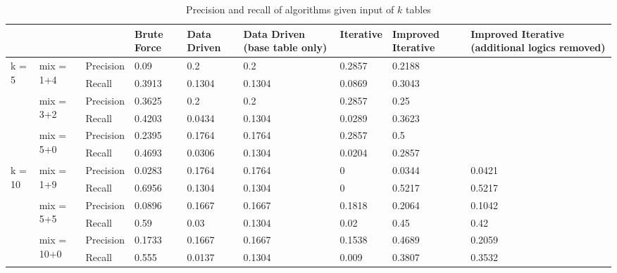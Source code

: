 \begin{table}[h!]
    \centering
    \scriptsize
    \begin{center}
      \caption{Precision and recall of algorithms given input of $k$ tables}
      \label{tab:Precision-and-recall-of-algorithms-given-input-of-k-tables}
      \begin{tabular}{|p{}|p{}|p{}|p{}|p{}|p{}|p{}|p{}|p{}|}  
        \hline
        & & & \textbf{Brute Force} & \textbf{Data Driven} & \textbf{Data Driven (base table only)} & \textbf{Iterative} & \textbf{Improved Iterative} & \textbf{Improved Iterative (additional logics removed)}\\
        \hline
        \multirow{6}{*}{k = 5} & \multirow{2}{*}{mix = 1+4} & Precision & 0.09 & 0.2 & 0.2 & 0.2857 & 0.2188 & \\
        \cline{3-9}
        & & Recall & 0.3913 & 0.1304 & 0.1304 & 0.0869 & 0.3043 & \\
        \cline{2-9}
        & \multirow{2}{*}{mix = 3+2} & Precision & 0.3625 & 0.2 &  0.2 & 0.2857 & 0.25 & \\
        \cline{3-9}
        & & Recall & 0.4203 & 0.0434 & 0.1304 & 0.0289 & 0.3623 & \\
        \cline{2-9}
        & \multirow{2}{*}{mix = 5+0} & Precision & 0.2395 & 0.1764 & 0.1764 & 0.2857 & 0.5 & \\
        \cline{3-9}
        & & Recall & 0.4693 & 0.0306 & 0.1304 & 0.0204 & 0.2857 & \\
        \hline        
        \multirow{6}{*}{k = 10} & \multirow{2}{*}{mix = 1+9} & Precision & 0.0283 & 0.1764 & 0.1764 & 0 & 0.0344 & 0.0421 \\
        \cline{3-9}
        & & Recall & 0.6956 & 0.1304 & 0.1304 & 0 & 0.5217 & 0.5217 \\
        \cline{2-9}
        & \multirow{2}{*}{mix = 5+5} & Precision & 0.0896 & 0.1667 & 0.1667 & 0.1818 & 0.2064 & 0.1042 \\
        \cline{3-9}
        & & Recall & 0.59 & 0.03 & 0.1304 & 0.02 & 0.45 & 0.42 \\
        \cline{2-9}
        & \multirow{2}{*}{mix = 10+0} & Precision & 0.1733 & 0.1667 & 0.1667 & 0.1538 & 0.4689 & 0.2059 \\
        \cline{3-9}
        & & Recall & 0.555 & 0.0137 & 0.1304 & 0.009 & 0.3807 & 0.3532 \\
        \hline
      \end{tabular}
    \end{center}
\end{table}

